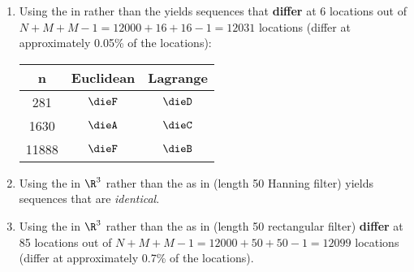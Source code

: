 \begin{example}
\begin{enumerate}
\begin{enumerate}
      \item Using the  in  rather than the  
            yields sequences that \textbf{differ} at 6 locations out of $N+M+M-1=12000+16+16-1=12031$ locations
            (differ at approximately 0.05\% of the locations):
            \\\indentx\begin{tabstr}{0.75}\begin{tabular}{|c|c|c|}
                         \hline%
                           n   & Euclidean & Lagrange
                         \\\hline
                             281 & $\dieF$ & $\dieD$ 
                         \\ 1630 & $\dieA$ & $\dieC$ 
                         \\11888 & $\dieF$ & $\dieB$ 
                         \\\hline
                       \end{tabular}\end{tabstr}

      \item Using the  in $\R^3$ rather than the  as in 
             (length 50 Hanning filter)
            yields sequences that are \emph{identical}. %

      \item Using the  in $\R^3$ rather than the  as 
            in  (length 50 rectangular filter)
            \textbf{differ} at 85 locations out of $N+M+M-1=12000+50+50-1=12099$ locations
            (differ at approximately 0.7\% of the locations). %
    \end{enumerate}

\end{enumerate}
\end{example}


